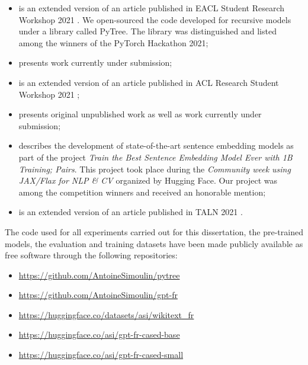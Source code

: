\begin{itemize}
    \item {} is an extended version of an article published in EACL Student Research Workshop 2021 \parencite{simoulin_2021a}. We  open-sourced the code developed for recursive models under a library called PyTree. The library was distinguished and listed among the winners of the PyTorch Hackathon 2021;
    \item {} presents work currently under submission;
    \item {} is an extended version of an article published in ACL Research Student Workshop 2021 \parencite{simoulin_2021b};
    \item {} presents original unpublished work as well as work currently under submission;
    \item {} describes the development of state-of-the-art sentence embedding models as part of the project \textit{Train the Best Sentence Embedding Model Ever with 1B Training; Pairs}. This project took place during the \textit{Community week using JAX/Flax for NLP \& CV} organized by Hugging Face. Our project was among the competition winners and received an honorable mention;
    \item {} is an extended version of an article published in TALN 2021 \parencite{simoulin_2021c}.
\end{itemize}


The code used for all experiments carried out for this dissertation, the pre-trained models, the evaluation and training datasets have been made publicly available as free software through the following repositories:

\begin{itemize}
    \item \url{https://github.com/AntoineSimoulin/pytree}
    \item \url{https://github.com/AntoineSimoulin/gpt-fr}
    \item \url{https://huggingface.co/datasets/asi/wikitext_fr}
    \item \url{https://huggingface.co/asi/gpt-fr-cased-base}
    \item \url{https://huggingface.co/asi/gpt-fr-cased-small}
\end{itemize}

